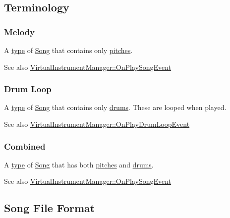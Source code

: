 \hypertarget{group___song_group_DocSongTerminology}{}\subsection{Terminology}\label{group___song_group_DocSongTerminology}
\hypertarget{group___song_group_DocSongMelody}{}\subsubsection{Melody}\label{group___song_group_DocSongMelody}
A \hyperlink{group___song_enums_gae681a1f001333e39fc1cb4fea97bfe1b}{type} of \hyperlink{class_song}{Song} that contains only \hyperlink{group___music_enums_ga508f69b199ea518f935486c990edac1d}{pitches}. \begin{DoxySeeAlso}{See also}
\hyperlink{group___v_i_m_handlers_ga7fd877a7d429403abbfd2728aa63c056}{Virtual\+Instrument\+Manager\+::\+On\+Play\+Song\+Event} 
\end{DoxySeeAlso}
\hypertarget{group___song_group_DocSongDrumLoop}{}\subsubsection{Drum Loop}\label{group___song_group_DocSongDrumLoop}
A \hyperlink{group___song_enums_gae681a1f001333e39fc1cb4fea97bfe1b}{type} of \hyperlink{class_song}{Song} that contains only \hyperlink{group___music_enums_gade475b4382c7066d1af13e7c13c029b6}{drums}. These are looped when played. \begin{DoxySeeAlso}{See also}
\hyperlink{group___v_i_m_handlers_gae2e2010b9a36ae2409466181ae0b9679}{Virtual\+Instrument\+Manager\+::\+On\+Play\+Drum\+Loop\+Event} 
\end{DoxySeeAlso}
\hypertarget{group___song_group_DocSongCombined}{}\subsubsection{Combined}\label{group___song_group_DocSongCombined}
A \hyperlink{group___song_enums_gae681a1f001333e39fc1cb4fea97bfe1b}{type} of \hyperlink{class_song}{Song} that has both \hyperlink{group___music_enums_ga508f69b199ea518f935486c990edac1d}{pitches} and \hyperlink{group___music_enums_gade475b4382c7066d1af13e7c13c029b6}{drums}. \begin{DoxySeeAlso}{See also}
\hyperlink{group___v_i_m_handlers_ga7fd877a7d429403abbfd2728aa63c056}{Virtual\+Instrument\+Manager\+::\+On\+Play\+Song\+Event}
\end{DoxySeeAlso}
\hypertarget{group___song_group_DocSongFileFormat}{}\subsection{Song File Format}\label{group___song_group_DocSongFileFormat}

